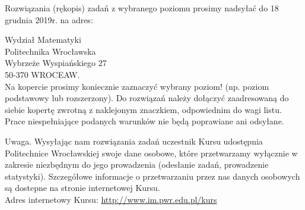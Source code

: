 \documentclass[10pt]{article}
\begin{document}
Rozwiązania (rękopis) zadań z wybranego poziomu prosimy nadsyłać do 18 grudnia 2019r. na adres:

Wydział Matematyki\\
Politechnika Wrocławska\\
Wybrzeże Wyspiańskiego 27\\
50-370 WROCEAW.\\
Na kopercie prosimy koniecznie zaznaczyć wybrany poziom! (np. poziom podstawowy lub rozszerzony). Do rozwiązań należy dołączyć zaadresowaną do siebie kopertę zwrotną z naklejonym znaczkiem, odpowiednim do wagi listu. Prace niespełniające podanych warunków nie będą poprawiane ani odsyłane.

Uwaga. Wysyłając nam rozwiązania zadań uczestnik Kursu udostępnia Politechnice Wrocławskiej swoje dane osobowe, które przetwarzamy wyłącznie w zakresie niezbędnym do jego prowadzenia (odesłanie zadań, prowadzenie statystyki). Szczegółowe informacje o przetwarzaniu przez nas danych osobowych są dostepne na stronie internetowej Kursu.\\
Adres internetowy Kursu: \href{http://www.im.pwr.edu.pl/kurs}{http://www.im.pwr.edu.pl/kurs}
\end{document}
